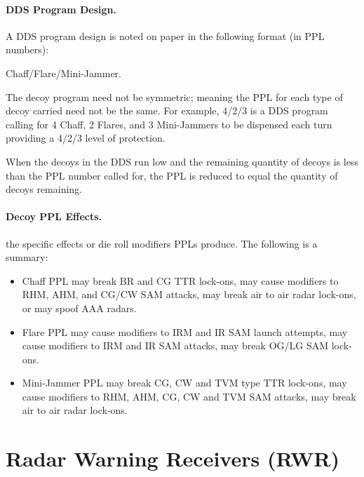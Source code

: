 \paragraph{DDS Program Design.} A DDS program design is noted on paper in the following format (in PPL numbers): 
\begin{center}
    Chaff/Flare/Mini-Jammer. 
\end{center}
The decoy program need not be symmetric; meaning the PPL for each type of decoy carried need not be the same. For example, 4/2/3 is a DDS program calling for 4 Chaff, 2 Flares, and 3 Mini-Jammers to be dispensed each turn providing a 4/2/3 level of protection.

When the decoys in the DDS run low and the remaining quantity of decoys is less than the PPL number called for, the PPL is reduced to equal the quantity of decoys remaining.


\paragraph{Decoy PPL Effects.}  the specific effects or die roll modifiers PPLs produce. The following is a summary:

\begin{itemize}

    \item Chaff PPL may break BR and CG TTR lock-ons, may cause modifiers to RHM, AHM, and CG/CW SAM attacks, may break air to air radar lock-ons, or may spoof AAA radars.

    \item Flare PPL may cause modifiers to IRM and IR SAM launch attempts, may cause modifiers to IRM and IR SAM attacks, may break OG/LG SAM lock-ons.

    \item Mini-Jammer PPL may break CG, CW and TVM type TTR lock-ons, may cause modifiers to RHM, AHM, CG, CW and TVM SAM attacks, may break air to air radar lock-ons.

\end{itemize}

\section{Radar Warning Receivers (RWR)}


